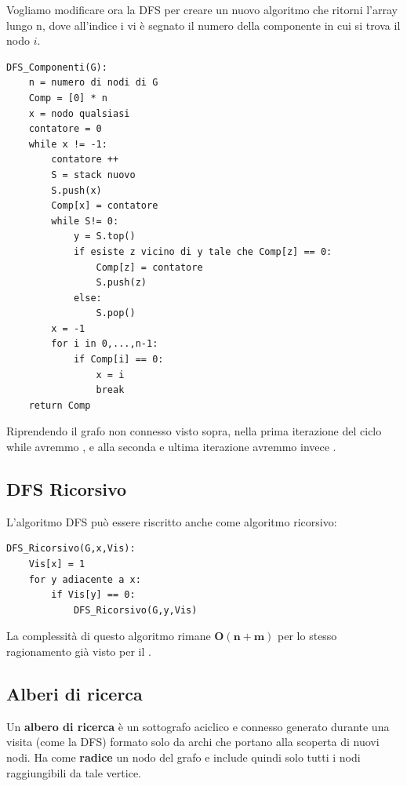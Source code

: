 \documentclass[11pt, a4paper, titlepage, oneside]{scrbook}
\begin{document}
Vogliamo modificare ora la DFS per creare un nuovo algoritmo che ritorni l'array  lungo n, dove all'indice i vi è segnato il numero della componente in cui si trova il nodo $i$.

\begin{lstlisting}[style=Python]
DFS_Componenti(G):
    n = numero di nodi di G
    Comp = [0] * n
    x = nodo qualsiasi
    contatore = 0
    while x != -1:
        contatore ++
        S = stack nuovo
        S.push(x)
        Comp[x] = contatore
        while S!= 0:
            y = S.top()
            if esiste z vicino di y tale che Comp[z] == 0:
                Comp[z] = contatore
                S.push(z)
            else:
                S.pop()
        x = -1
        for i in 0,...,n-1:
            if Comp[i] == 0:
                x = i
                break
    return Comp
\end{lstlisting}

Riprendendo il grafo non connesso visto sopra, nella prima iterazione del ciclo while avremmo , e alla seconda e ultima iterazione avremmo invece .

\subsection{DFS Ricorsivo}

L'algoritmo DFS può essere riscritto anche come algoritmo ricorsivo:
\begin{lstlisting}[style=Python]
DFS_Ricorsivo(G,x,Vis):
    Vis[x] = 1
    for y adiacente a x:
        if Vis[y] == 0:
            DFS_Ricorsivo(G,y,Vis)
\end{lstlisting}

La complessità di questo algoritmo rimane $\textbf{O}\bm{(n+m)}$ per lo stesso ragionamento già visto per il .

\subsection{Alberi di ricerca}

\begin{Definizione}
\label{def-albero-ricerca}
Un \textbf{albero di ricerca} è un sottografo aciclico e connesso generato durante una visita (come la DFS) formato solo da archi che portano alla scoperta di nuovi nodi. Ha come \textbf{radice} un nodo del grafo e include quindi solo tutti i nodi raggiungibili da tale vertice.
\end{Definizione}
\end{document}
